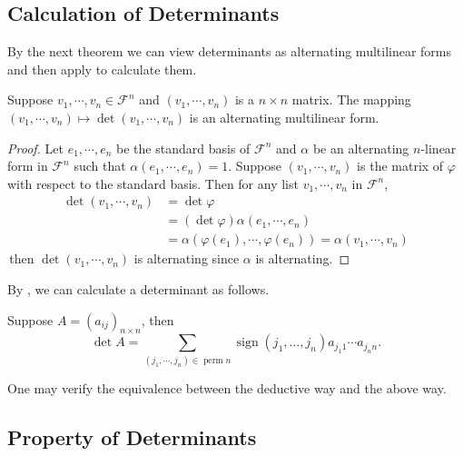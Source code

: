 \subsection{Calculation of Determinants}
By the next theorem we can view determinants as alternating multilinear forms and then apply  to calculate them. 
\begin{theorem}
Suppose $v_1,\cdots,v_n \in \mathcal{F}^n$ and $(v_1,\cdots, v_n)$ is a $n\times n$ matrix. The mapping $(v_1,\cdots, v_n) \mapsto \det (v_1,\cdots, v_n)$ is an alternating multilinear form.
\end{theorem}
\begin{proof}
    Let $e_1,\cdots,e_n$ be the standard basis of $\mathcal{F}^n$ and $\alpha$ be an alternating $n$-linear form in $\mathcal{F}^n$ such that
    $\alpha(e_1,\cdots,e_n) = 1$. Suppose $(v_1,\cdots,v_n)$ is the matrix of $\varphi$ with respect to the standard basis. Then for any list $v_1,\cdots,v_n$ in $\mathcal{F}^n$,
    $$\begin{aligned}
        \det (v_1,\cdots, v_n) &= \det \varphi \\
        & =(\det \varphi) \alpha(e_1,\cdots,e_n) \\
        &= \alpha(\varphi(e_1),\cdots,\varphi(e_n)) = \alpha(v_1,\cdots, v_n)
    \end{aligned}$$
    \,then $\det (v_1,\cdots, v_n)$ is alternating since $\alpha$ is alternating.
\end{proof}

By , we can calculate a determinant as follows.
\begin{theorem}
    Suppose $A = (a_{ij})_{n\times n}$, then
    $$\det A = \sum_{(j_1,\cdots, j_n) \in \operatorname{perm} n} \operatorname{sign}(j_1, \ldots, j_n) a_{j_1 1}\cdots a_{j_n n} .$$ 
\end{theorem}

One may verify the equivalence between the deductive way and the above way.

\subsection{Property of Determinants}

